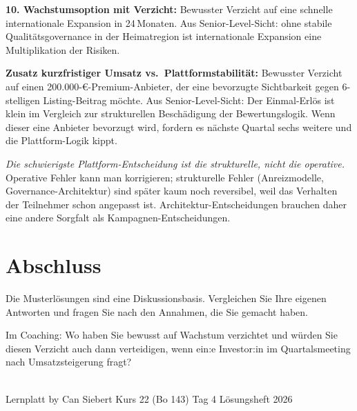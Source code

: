 \documentclass[11pt,a4paper,oneside]{article}
\begin{document}
\begin{loesungbox}
\textbf{10. Wachstumsoption mit Verzicht:}
Bewusster Verzicht auf eine schnelle internationale Expansion in 24\,Monaten. Aus Senior-Level-Sicht: ohne stabile Qualitätsgovernance in der Heimatregion ist internationale Expansion eine Multiplikation der Risiken.

\textbf{Zusatz \textendash{} kurzfristiger Umsatz vs.\ Plattformstabilität:}
Bewusster Verzicht auf einen 200.000-\euro-Premium-Anbieter, der eine bevorzugte Sichtbarkeit gegen 6-stelligen Listing-Beitrag möchte. Aus Senior-Level-Sicht: Der Einmal-Erlös ist klein im Vergleich zur strukturellen Beschädigung der Bewertungslogik. Wenn dieser eine Anbieter bevorzugt wird, fordern es nächste Quartal sechs weitere \textendash{} und die Plattform-Logik kippt.

\begin{merkbox}
\emph{Die schwierigste Plattform-Entscheidung ist die strukturelle, nicht die operative.} Operative Fehler kann man korrigieren; strukturelle Fehler (Anreizmodelle, Governance-Architektur) sind später kaum noch reversibel, weil das Verhalten der Teilnehmer schon angepasst ist. Architektur-Entscheidungen brauchen daher eine andere Sorgfalt als Kampagnen-Entscheidungen.
\end{merkbox}
\end{loesungbox}

\clearpage

\section*{Abschluss}
\thispagestyle{plain}

\noindent Die Musterlösungen sind eine Diskussionsbasis. Vergleichen Sie Ihre eigenen Antworten und fragen Sie nach den Annahmen, die Sie gemacht haben.

\medskip
\begin{infobox}
Im Coaching: Wo haben Sie bewusst auf Wachstum verzichtet \textendash{} und würden Sie diesen Verzicht auch dann verteidigen, wenn ein:e Investor:in im Quartalsmeeting nach Umsatzsteigerung fragt?
\end{infobox}

\vspace{1cm}
\noindent{\color{lpAccent}\rule{\linewidth}{0.6pt}}\\[4pt]
{\footnotesize\sffamily\color{lpGray}Lernplatt \textperiodcentered{} by Can Siebert \textperiodcentered{} Kurs 22 (Bo 143) \textperiodcentered{} Tag 4 \textperiodcentered{} Lösungsheft \textperiodcentered{} \textcopyright{} 2026}
\end{document}
